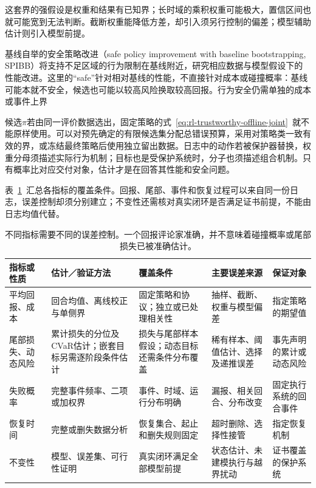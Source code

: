 这套界的强假设是权重和结果有已知界；长时域的乘积权重可能极大，置信区间也就可能宽到无法判断。截断权重能降低方差，却引入须另行控制的偏差；模型辅助估计则引入模型前提。

基线自举的安全策略改进（safe policy improvement with baseline bootstrapping, SPIBB）将支持不足区域的行为限制在基线附近，研究相应数据与模型假设下的性能改进。这里的“safe”针对相对基线的性能，不直接针对成本或碰撞概率：基线可能本就不安全，候选也可能以较高风险换取较高回报。行为安全仍需单独的成本或事件上界

候选$\pi$若由同一评价数据选出，固定策略的式~\eqref{eq:rl-trustworthy-offline-joint}~就不能原样使用。可以对预先确定的有限候选集分配总错误预算，采用对策略类一致有效的界，或冻结最终策略后使用独立留出数据。日志中的动作若被保护器替换，权重分母须描述实际行为机制；目标也是受保护系统时，分子也须描述组合机制。只有概率比对应交付对象，估计才是在回答其性能和安全问题。

表~\ref{tab:rl-trustworthy-indicators}~汇总各指标的覆盖条件。回报、尾部、事件和恢复过程可以来自同一份日志，误差控制却须分别建立；不变性还需核对真实闭环是否满足证书前提，不能由日志均值代替。

\begin{table}[t]
  \centering
  \begin{tabularx}{\linewidth}{@{}>{\raggedright\arraybackslash}p{19mm}XXXX@{}}
    \toprule
    指标或性质 & 估计／验证方法 & 覆盖条件 & 主要误差来源 & 保证对象 \\
    \midrule
    平均回报、成本 & 回合均值、离线校正与单侧界 & 固定策略和协议；独立或已处理相关性 & 抽样、截断、权重与模型偏差 & 指定策略的期望值 \\
    尾部损失、动态风险 & 累计损失的分位及CVaR估计；嵌套目标另需逐阶段条件估计 & 损失与尾部样本假设；动态目标还需条件分布覆盖 & 稀有样本、阈值估计、选择及递推误差 & 事先声明的累计或动态风险 \\
    失败概率 & 完整事件频率、二项或加权界 & 事件、时域、运行分布明确 & 漏报、相关回合、分布改变 & 固定执行系统的回合事件 \\
    恢复时间 & 完整或删失数据分析 & 恢复集合、起止和删失规则固定 & 超时删除、选择性接管 & 指定恢复机制 \\
    不变性 & 模型、误差集、可行性证明 & 真实闭环满足全部模型前提 & 状态估计、未建模执行与越界扰动 & 证书覆盖的保护系统 \\
    \bottomrule
  \end{tabularx}
  \caption{不同指标需要不同的误差控制。一个回报评论家准确，并不意味着碰撞概率或尾部损失已被准确估计。}
  \label{tab:rl-trustworthy-indicators}
\end{table}

